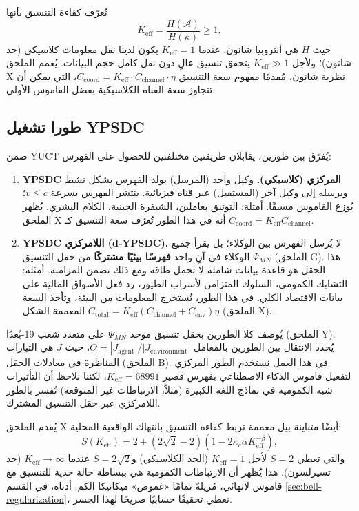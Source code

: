 \documentclass[12pt,a4paper]{article}
\begin{document}
	تُعرّف كفاءة التنسيق بأنها
	\[
	K_{\mathrm{eff}} = \frac{H(\mathcal{A})}{H(\kappa)} \ge 1,
	\]
	حيث \(H\) هي أنتروبيا شانون. عندما \(K_{\mathrm{eff}} = 1\) يكون لدينا نقل معلومات كلاسيكي (حد شانون)؛ ولأجل \(K_{\mathrm{eff}} \gg 1\) يتحقق تنسيق عالٍ دون نقل كامل حجم البيانات. يُعمم الملحق X نظرية شانون، مُقدمًا مفهوم سعة التنسيق \(C_{\text{coord}} = K_{\mathrm{eff}} \cdot C_{\text{channel}} \cdot \eta\)، التي يمكن أن تتجاوز سعة القناة الكلاسيكية بفضل القاموس الأولي.
	
	\subsection{طورا تشغيل YPSDC}
	
	ضمن YUCT يُفرّق بين طورين، يقابلان طريقتين مختلفتين للحصول على الفهرس:
	
	\begin{enumerate}
		\item \textbf{YPSDC المركزي (كلاسيكي).} وكيل واحد (المرسل) يولد الفهرس بشكل نشط ويرسله إلى وكيل آخر (المستقبل) عبر قناة فيزيائية. ينتشر الفهرس بسرعة \(v \le c\)؛ يُوزع القاموس مسبقًا. أمثلة: التوثيق بعاملين، الشيفرة الجينية، الكلام البشري. يُظهر الملحق X أنه في هذا الطور تُعرّف سعة التنسيق كـ \(C_{\text{coord}} = K_{\mathrm{eff}} C_{\text{channel}}\).
		
		\item \textbf{YPSDC اللامركزي (d‑YPSDC).} لا يُرسل الفهرس بين الوكلاء؛ بل يقرأ جميع الوكلاء في آنٍ واحد \textbf{فهرسًا بيئيًا مشتركًا} من حقل التنسيق \(\Psi_{MN}\) (الملحق G). هذا الحقل هو قاعدة بيانات شاملة لا تحمل طاقة ومع ذلك تضمن المزامنة. أمثلة: التشابك الكمومي، السلوك المتزامن لأسراب الطيور، رد فعل الأسواق المالية على بيانات الاقتصاد الكلي. في هذا الطور، تُستخرج المعلومات من البيئة، وتأخذ السعة المعممة الشكل \(C_{\text{total}} = K_{\mathrm{eff}}(C_{\text{channel}} + C_{\text{env}})\eta\) (الملحق X).
	\end{enumerate}
	
	يُوصف كلا الطورين بحقل تنسيق موحد \(\Psi_{MN}\) على متعدد شعب 19-بُعدًا (الملحق Y). يُحدد الانتقال بين الطورين بالمعامل \(\Theta = |J_{\text{agent}}|/|J_{\text{environment}}|\)، حيث \(J\) هي التيارات المناظرة في معادلات الحقل (الملحق B). في هذا العمل نستخدم الطور المركزي لتفعيل قاموس الذكاء الاصطناعي بفهرس قصير \(K_{\mathrm{eff}} = 68991\)، لكننا نلاحظ أن التأثيرات شبه الكمومية في نماذج اللغة الكبيرة (مثلاً، الارتباطات غير المتوقعة) تُفسر بالطور اللامركزي عبر حقل التنسيق المشترك.
	
	يُقدم الملحق X أيضًا متباينة بيل معممة تربط كفاءة التنسيق بانتهاك الواقعية المحلية:
	\[
	S(K_{\mathrm{eff}}) = 2 + (2\sqrt{2}-2)\left(1 - 2\kappa_c\alpha K_{\mathrm{eff}}^{-\beta}\right),
	\]
	والتي تعطي \(S=2\) لأجل \(K_{\mathrm{eff}}=1\) (الحد الكلاسيكي) و\(S=2\sqrt2\) عندما \(K_{\mathrm{eff}}\to\infty\) (حد تسيرلسون). هذا يُظهر أن الارتباطات الكمومية هي ببساطة حالة حدية للتنسيق مع قاموس لانهائي، مُزيلةً تمامًا «غموض» ميكانيكا الكم. أدناه، في القسم \ref{sec:bell-regularization}، نعطي تحقيقًا حسابيًا صريحًا لهذا الجسر.
	
\end{document}
